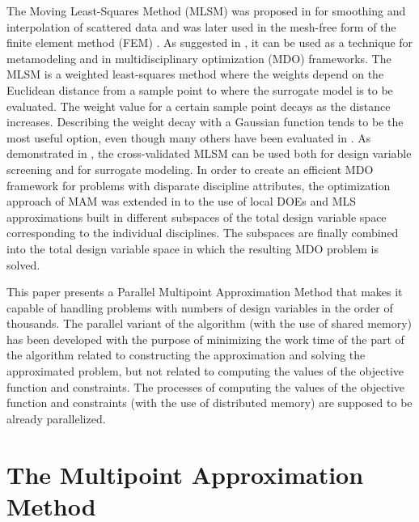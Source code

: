 \documentclass[runningheads,a4paper]{llncs}
\begin{document}
The Moving Least-Squares Method (MLSM) was proposed in
\cite{LancasterSalkauskas1981} for smoothing and interpolation of scattered
data and was later used in the mesh-free form of the finite element method
(FEM) \cite{Liszka1984}. As suggested in \cite{ChoiYounYang2001}, it can be
used as a technique for metamodeling and in multidisciplinary optimization
(MDO) frameworks. The MLSM is a weighted least-squares method where the weights
depend on the Euclidean distance from a sample point to where the surrogate
model is to be evaluated. The weight value for a certain sample point decays as
the distance increases. Describing the weight decay with a Gaussian function
tends to be the most useful option, even though many others have been evaluated
in \cite{ToropovSchrammSahaiJones2005}. As demonstrated in
\cite{PolynkinToropov2010}, the cross-validated MLSM can be used both for
design variable screening and for surrogate modeling. In order to create an
efficient MDO framework for problems with disparate discipline attributes, the
optimization approach of MAM was extended  in \cite{OllarToropovJones2014} to
the use of local DOEs and MLS approximations built in different subspaces of
the total design variable space corresponding to the individual disciplines.
The subspaces are finally combined into the total design variable space in
which the resulting MDO problem is solved.

This paper presents a Parallel Multipoint Approximation Method that makes it
capable of handling problems with numbers of design variables in the order of
thousands. The parallel variant of the algorithm (with the use of shared
memory) has been developed with the purpose of minimizing the work time of the
part of the algorithm related to constructing the approximation and solving the
approximated problem, but not related to computing the values of the objective
function and constraints. The processes of computing the values of the
objective function and constraints (with the use of distributed memory) are
supposed to be already parallelized.

\section{The Multipoint Approximation Method}
\label{sec:MAM}
\end{document}
